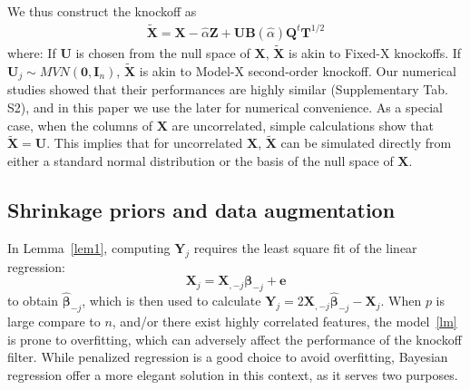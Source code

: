 \documentclass[12pt,Times]{article}
\def\0{{\mathbf{0}}}
\def\T{{\mathbf{T}}}
\def\e{{\mathbf{e}}}
\def\tX{{\mathbf{\tilde{X}}}}
\def\X{{\mathbf{X}}}
\def\Y{{\mathbf{Y}}}
\def\B{{\mathbf{B}}}
\def\mbeta{{\mathbf{\beta}}}
\def\Z{{\mathbf{Z}}}
\def\Q{{\mathbf{Q}}}
\def\U{{\mathbf{U}}}
\def\I{{\mathbf{I}}}
\begin{document}
We thus construct the knockoff as 
\begin{equation} \label{reflection.knockoff}
\begin{aligned}
\tX = \X  - \hat\alpha \Z + \U \B(\hat\alpha) \Q^t \T^{1/2} 
\end{aligned}
\end{equation}
where: If $\U$ is chosen from the null space of $\X$, $\tX$ is akin to Fixed-X knockoffs.  If $\U_j \sim MVN(\0,\I_n)$, $\tX$ is akin to Model-X second-order knockoff. 
Our numerical studies showed that their performances are highly similar (Supplementary Tab. S2), and in this paper we use the later for numerical convenience.  
As a special case,  when the columns of $\X$ are uncorrelated, simple calculations show that $\tX = \U$. This implies that for uncorrelated $\X$, $\tX$ can be simulated directly from either a standard normal distribution or the basis of the null space of $\X.$ 




\subsection{Shrinkage priors and data augmentation}

In Lemma~\ref{lem1}, computing $\Y_j$ requires  the least square fit of the linear regression: 
\begin{equation} \label{lm}
\X_j = \X_{,-j} \mbeta_{-j} + \e
\end{equation}
to obtain $\hat\mbeta_{-j}$, which is then used to calculate $\Y_j = 2 \X_{,-j} \hat\mbeta_{-j}  - \X_j$.  
When $p$ is large compare to $n$, and/or there exist highly correlated features, the model~\eqref{lm} is prone to overfitting, which can adversely affect the performance of the knockoff filter. 
While penalized regression is a good choice to avoid overfitting, Bayesian regression offer a more elegant solution in this context,  as it serves two purposes. 
\end{document}
